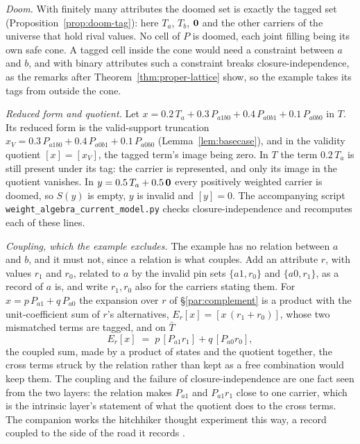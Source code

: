 \emph{Doom.} With finitely many attributes the doomed set is exactly the tagged set (Proposition~\ref{prop:doom-tag}): here $T_a$, $T_b$, $\mathbf{0}$ and the other carriers of the universe that hold rival values. No cell of $P$ is doomed, each joint filling being its own safe cone. A tagged cell inside the cone would need a constraint between $a$ and $b$, and with binary attributes such a constraint breaks closure-independence, as the remarks after Theorem~\ref{thm:proper-lattice} show, so the example takes its tags from outside the cone.

\emph{Reduced form and quotient.} Let $x = 0.2\, T_a + 0.3\, P_{a1b0} + 0.4\, P_{a0b1} + 0.1\, P_{a0b0}$ in $T$. Its reduced form is the valid-support truncation $x_V = 0.3\, P_{a1b0} + 0.4\, P_{a0b1} + 0.1\, P_{a0b0}$ (Lemma~\ref{lem:basecase}), and in the validity quotient $[x] = [x_V]$, the tagged term's image being zero. In $T$ the term $0.2\, T_a$ is still present under its tag: the carrier is represented, and only its image in the quotient vanishes. In $y = 0.5\, T_a + 0.5\, \mathbf{0}$ every positively weighted carrier is doomed, so $S(y)$ is empty, $y$ is invalid and $[y] = 0$. The accompanying script \texttt{weight\_algebra\_current\_model.py} checks closure-independence and recomputes each of these lines.

\emph{Coupling, which the example excludes.} The example has no relation between $a$ and $b$, and it must not, since a relation is what couples. Add an attribute $r$, with values $r_1$ and $r_0$, related to $a$ by the invalid pin sets $\{a1, r_0\}$ and $\{a0, r_1\}$, as a record of $a$ is, and write $r_1, r_0$ also for the carriers stating them. For $x = p\,P_{a1} + q\,P_{a0}$ the expansion over $r$ of \S\ref{par:complement} is a product with the unit-coefficient sum of $r$'s alternatives, $E_r[x] = [x\,(r_1 + r_0)]$, whose two mismatched terms are tagged, and on $\bar T$
\[ E_r[x] \;=\; p\,[P_{a1} r_1] + q\,[P_{a0} r_0], \]
the coupled sum, made by a product of states and the quotient together, the cross terms struck by the relation rather than kept as a free combination would keep them. The coupling and the failure of closure-independence are one fact seen from the two layers: the relation makes $P_{a1}$ and $P_{a1} r_1$ close to one carrier, which is the intrinsic layer's statement of what the quotient does to the cross terms. The companion works the hitchhiker thought experiment this way, a record coupled to the side of the road it records \cite{Aethus}.


